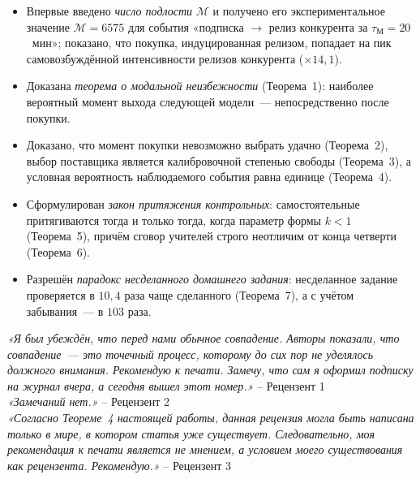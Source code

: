 \documentclass[11pt,a4paper]{article}
\newcommand{\tM}{\tau_{\mathrm{М}}}
\newcommand{\Mp}{\mathcal{M}}
\begin{document}
\begin{zhplhighlights}
\begin{itemize}
\setlength\itemsep{0pt}
\setlength\parskip{0pt}
\item Впервые введено \emph{число подлости} $\Mp$ и получено его экспериментальное значение $\Mp = 6575$ для события «подписка $\to$ релиз конкурента за $\tM = 20$~мин»; показано, что покупка, индуцированная релизом, попадает на пик самовозбуждённой интенсивности релизов конкурента ($\times 14{,}1$).
\item Доказана \emph{теорема о модальной неизбежности} (Теорема~1): наиболее вероятный момент выхода следующей модели~--- непосредственно после покупки.
\item Доказано, что момент покупки невозможно выбрать удачно (Теорема~2), выбор поставщика является калибровочной степенью свободы (Теорема~3), а условная вероятность наблюдаемого события равна единице (Теорема~4).
\item Сформулирован \emph{закон притяжения контрольных}: самостоятельные притягиваются тогда и только тогда, когда параметр формы $k<1$ (Теорема~5), причём сговор учителей строго неотличим от конца четверти (Теорема~6).
\item Разрешён \emph{парадокс несделанного домашнего задания}: несделанное задание проверяется в $10{,}4$ раза чаще сделанного (Теорема~7), а с учётом забывания~--- в $103$ раза.
\end{itemize}
\end{zhplhighlights}

\begin{zhplreviews}
\textit{«Я был убеждён, что перед нами обычное совпадение. Авторы показали, что совпадение~--- это точечный процесс, которому до сих пор не уделялось должного внимания. Рекомендую к печати. Замечу, что сам я оформил подписку на журнал вчера, а сегодня вышел этот номер.»} -- Рецензент 1\\
\textit{«Замечаний нет.»} -- Рецензент 2\\
\textit{«Согласно Теореме~4 настоящей работы, данная рецензия могла быть написана только в мире, в котором статья уже существует. Следовательно, моя рекомендация к печати является не мнением, а условием моего существования как рецензента. Рекомендую.»} -- Рецензент 3
\end{zhplreviews}
\end{document}
